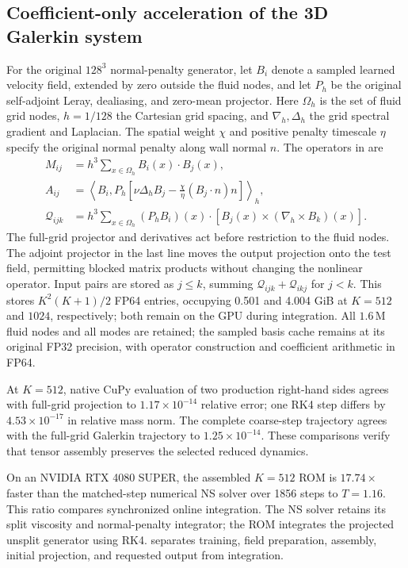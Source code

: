 \subsection{Coefficient-only acceleration of the 3D Galerkin system}
\label{app:coefficient-acceleration}
For the original $128^3$ normal-penalty generator, let $B_i$ denote a sampled learned velocity field, extended by zero outside the fluid nodes, and let $P_h$ be the original self-adjoint Leray, dealiasing, and zero-mean projector. Here $\Omega_h$ is the set of fluid grid nodes, $h=1/128$ the Cartesian grid spacing, and $\nabla_h,\Delta_h$ the grid spectral gradient and Laplacian. The spatial weight $\chi$ and positive penalty timescale $\eta$ specify the original normal penalty along wall normal $n$. The operators in  are
\begin{align}
M_{ij}&=h^3\sum_{x\in\Omega_h}B_i(x)\cdot B_j(x),\\
A_{ij}&=\left\langle B_i,P_h\left[\nu\Delta_h B_j-\frac{\chi}{\eta}(B_j\cdot n)n\right]\right\rangle_h,\\
\mathcal Q_{ijk}&=h^3\sum_{x\in\Omega_h}(P_hB_i)(x)\cdot\left[B_j(x)\times(\nabla_h\times B_k)(x)\right].
\end{align}
The full-grid projector and derivatives act before restriction to the fluid nodes. The adjoint projector in the last line moves the output projection onto the test field, permitting blocked matrix products without changing the nonlinear operator. Input pairs are stored as $j\leq k$, summing $\mathcal Q_{ijk}+\mathcal Q_{ikj}$ for $j<k$. This stores $K^2(K+1)/2$ FP64 entries, occupying 0.501 and 4.004 GiB at $K=512$ and $1024$, respectively; both remain on the GPU during integration. All $1.6\,\mathrm{M}$ fluid nodes and all modes are retained; the sampled basis cache remains at its original FP32 precision, with operator construction and coefficient arithmetic in FP64.

At $K=512$, native CuPy evaluation of two production right-hand sides agrees with full-grid projection to $1.17\times10^{-14}$ relative error; one RK4 step differs by $4.53\times10^{-17}$ in relative mass norm. The complete coarse-step trajectory agrees with the full-grid Galerkin trajectory to $1.25\times10^{-14}$. These comparisons verify that tensor assembly preserves the selected reduced dynamics.

On an NVIDIA RTX 4080 SUPER, the assembled $K=512$ ROM is $17.74\times$ faster than the matched-step numerical NS solver over 1856 steps to $T=1.16$. This ratio compares synchronized online integration. The NS solver retains its split viscosity and normal-penalty integrator; the ROM integrates the projected unsplit generator using RK4.  separates training, field preparation, assembly, initial projection, and requested output from integration.

